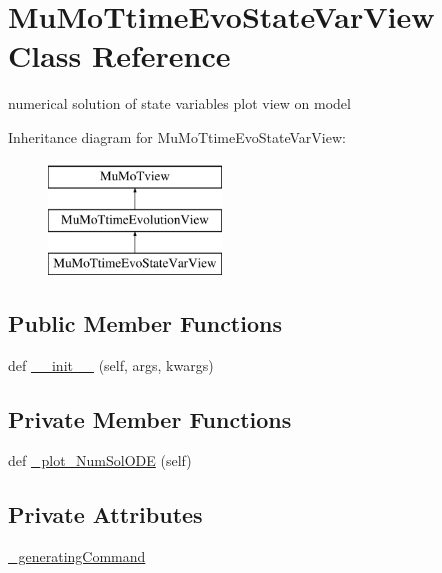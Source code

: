 \hypertarget{class_mu_mo_t_1_1_mu_mo_t_1_1_mu_mo_ttime_evo_state_var_view}{}\section{Mu\+Mo\+Ttime\+Evo\+State\+Var\+View Class Reference}
\label{class_mu_mo_t_1_1_mu_mo_t_1_1_mu_mo_ttime_evo_state_var_view}


numerical solution of state variables plot view on model  


Inheritance diagram for Mu\+Mo\+Ttime\+Evo\+State\+Var\+View\+:\begin{figure}[H]
\begin{center}
\leavevmode
\includegraphics[height=3.000000cm]{class_mu_mo_t_1_1_mu_mo_t_1_1_mu_mo_ttime_evo_state_var_view}
\end{center}
\end{figure}
\subsection*{Public Member Functions}
\begin{DoxyCompactItemize}
\item 
def \hyperlink{class_mu_mo_t_1_1_mu_mo_t_1_1_mu_mo_ttime_evo_state_var_view_a302afe6819b093163cc8ea6f029c75da}{\+\_\+\+\_\+init\+\_\+\+\_\+} (self, args, kwargs)
\end{DoxyCompactItemize}
\subsection*{Private Member Functions}
\begin{DoxyCompactItemize}
\item 
def \hyperlink{class_mu_mo_t_1_1_mu_mo_t_1_1_mu_mo_ttime_evo_state_var_view_a588142f52d59a2abf3229d40beffbe7e}{\+\_\+plot\+\_\+\+Num\+Sol\+O\+DE} (self)
\end{DoxyCompactItemize}
\subsection*{Private Attributes}
\begin{DoxyCompactItemize}
\item 
\hyperlink{class_mu_mo_t_1_1_mu_mo_t_1_1_mu_mo_ttime_evo_state_var_view_ace48ed03490093d8f44cde91e2f1e86e}{\+\_\+generating\+Command}
\end{DoxyCompactItemize}

